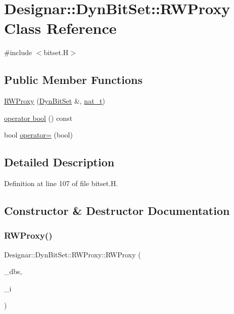 \hypertarget{class_designar_1_1_dyn_bit_set_1_1_r_w_proxy}{}\section{Designar\+:\+:Dyn\+Bit\+Set\+:\+:R\+W\+Proxy Class Reference}
\label{class_designar_1_1_dyn_bit_set_1_1_r_w_proxy}


{\ttfamily \#include $<$bitset.\+H$>$}

\subsection*{Public Member Functions}
\begin{DoxyCompactItemize}
\item 
\hyperlink{class_designar_1_1_dyn_bit_set_1_1_r_w_proxy_aef016918f952b339bfb60b29f6b9bcbb}{R\+W\+Proxy} (\hyperlink{class_designar_1_1_dyn_bit_set}{Dyn\+Bit\+Set} \&, \hyperlink{namespace_designar_aa72662848b9f4815e7bf31a7cf3e33d1}{nat\+\_\+t})
\item 
\hyperlink{class_designar_1_1_dyn_bit_set_1_1_r_w_proxy_ae2b7bc44f30f8b75d8fc2306167f9598}{operator bool} () const
\item 
bool \hyperlink{class_designar_1_1_dyn_bit_set_1_1_r_w_proxy_ad9dff242f5550a97af94c1e4ecd163ad}{operator=} (bool)
\end{DoxyCompactItemize}


\subsection{Detailed Description}


Definition at line 107 of file bitset.\+H.



\subsection{Constructor \& Destructor Documentation}
\mbox{\label{class_designar_1_1_dyn_bit_set_1_1_r_w_proxy_aef016918f952b339bfb60b29f6b9bcbb}} 
\subsubsection{\texorpdfstring{R\+W\+Proxy()}{RWProxy()}}
{\footnotesize\ttfamily Designar\+::\+Dyn\+Bit\+Set\+::\+R\+W\+Proxy\+::\+R\+W\+Proxy (\begin{DoxyParamCaption}\item[{\hyperlink{class_designar_1_1_dyn_bit_set}{Dyn\+Bit\+Set} \&}]{\+\_\+dbs,  }\item[{\hyperlink{namespace_designar_aa72662848b9f4815e7bf31a7cf3e33d1}{nat\+\_\+t}}]{\+\_\+i }\end{DoxyParamCaption})}



